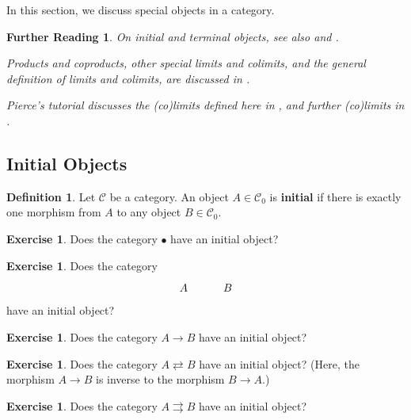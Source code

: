 \documentclass[a4paper,10pt]{scrartcl}
\theoremstyle{plain}
\newtheorem*{reading*}{Further Reading}
\theoremstyle{definition}
\newtheorem{dfn}[thm]{Definition}
\newtheorem{exer}[thm]{Exercise}
\newcommand{\Cat}[1]{\mathcal{#1}}
\newcommand{\CC}{\Cat{C}}
\newcommand{\Ob}[1]{{#1}_0}
\begin{document}
In this section, we discuss special objects in a category. 

\begin{reading*}
  On initial and terminal objects, see also \cite[\S 2.7.16]{barr-wells} and \cite[p. 48ff]{leinster}.

  Products and coproducts, other special limits and colimits, and the general definition of limits and colimits, are discussed in \cite[\S\S 5.1, 5.2]{leinster}.

  Pierce's tutorial discusses the (co)limits defined here in \cite[\S\S 2.3--2.4]{pierce}, and further (co)limits in  \cite[\S\S 2.5--2.7]{pierce}.

  
\end{reading*}

\subsection{Initial Objects}
\label{sec:initial-objects}



\begin{dfn}
  Let $\CC$ be a category. An object $A \in \Ob{\CC}$ is \textbf{initial} if there is exactly one morphism from $A$ to any object $B \in \Ob{\CC}$.
\end{dfn}

\begin{exer}
  Does the category $\bullet$ have an initial object?
\end{exer}

\begin{exer}
  Does the category 
  \[ 
  \begin{tikzcd}
  	A & B
  \end{tikzcd}  
   \] 
  have an initial object?
\end{exer}


\begin{exer}
  Does the category $A \to B$ have an initial object?
\end{exer}

\begin{exer}
  Does the category $A \rightleftarrows B$ have an initial object? (Here, the morphism $A \to B$ is inverse to the morphism $B \to A$.)
\end{exer}

\begin{exer}
  Does the category $A \rightrightarrows B$ have an initial object?
\end{exer}
\end{document}
